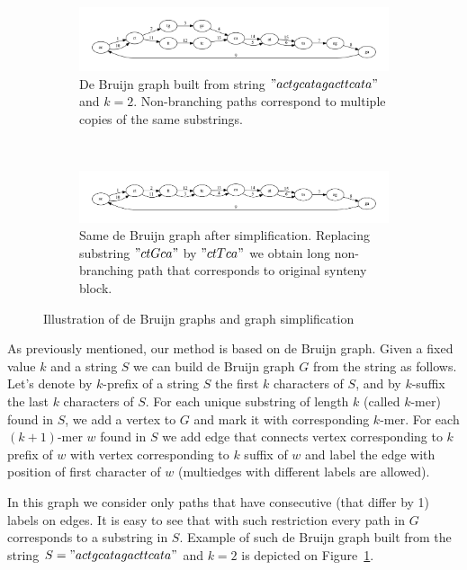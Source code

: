 \documentclass[a4paper, 12pt]{scrartcl}
\begin{document}
\begin{figure}
        \begin{subfigure}[a]{1\textwidth}
		\includegraphics[scale = 0.45]{graph1.pdf}
		\small \caption{De Bruijn graph built from string \("actgcatagacttcata"\) and \(k = 2\). Non-branching paths correspond to multiple
			copies of the same substrings.}
		\label{DeBruijnA}
        \end{subfigure}
	\\
        \begin{subfigure}[b]{1\textwidth}
		\includegraphics[scale = 0.45]{graph2.pdf}
		\small \caption{Same de Bruijn graph after simplification. Replacing substring \("ctGca"\) by \("ctTca"\) we obtain long non-branching path
			that corresponds to original synteny block.}
		\label{DeBruijnB}
        \end{subfigure}
	\small \caption{Illustration of de Bruijn graphs and graph simplification}
\end{figure}

As previously mentioned, our method is based on de Bruijn graph.
Given a fixed value \(k\) and a string \(S\) we can build de Bruijn graph \(G\) from the string as follows.
Let's denote by \(k\)-prefix of a string \(S\) the first \(k\) characters of \(S\), and by \(k\)-suffix the last \(k\) characters of \(S\).
For each unique substring of length \(k\) (called \(k\)-mer) found in \(S\), we add a vertex to \(G\) and mark it with
corresponding \(k\)-mer. For each \((k + 1)\)-mer \(w\) found in \(S\) we add edge that connects vertex corresponding to
\(k\) prefix of \(w\) with vertex corresponding to \(k\) suffix of \(w\) and label the edge with position of first character of \(w\)
(multiedges with different labels are allowed).

In this graph we consider only paths that have consecutive (that differ by 1) labels on edges. It is easy to see that with such restriction every path in \(G\)
corresponds to a substring in \(S\). Example of such de Bruijn graph built from the string \(S = "actgcatagacttcata" \) and \(k = 2\) is
depicted on Figure~\ref{DeBruijnA}.
\end{document}
